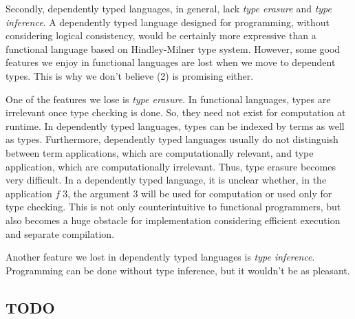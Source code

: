 Secondly, dependently typed languages, in general, lack \emph{type erasure}
and \emph{type inference}. A dependently typed language designed for
programming, without considering logical consistency, would be certainly
more expressive than a functional language based on Hindley-Milner type system.
However, some good features we enjoy in functional languages are lost when we
move to dependent types. This is why we don't believe (2) is promising either.

One of the features we lose is \emph{type erasure}. In functional languages,
types are irrelevant once type checking is done. So, they need not exist for
computation at runtime. In dependently typed languages, types can be indexed
by terms as well as types. Furthermore, dependently typed languages usually
do not distinguish between term applications, which are computationally
relevant, and type application, which are computationally irrelevant.
Thus, type erasure becomes very difficult. In a dependently typed language,
it is unclear whether, in the application $f\;3$, the argument $3$ will be
used for computation or used only for type checking.
This is not only counterintuitive to functional programmers, but also becomes
a huge obstacle for implementation considering efficient execution and
separate compilation.

Another feature we lost in dependently typed languages is
\emph{type inference}. Programming can be done without type inference,
but it wouldn't be as pleasant.

\subsection{TODO}

